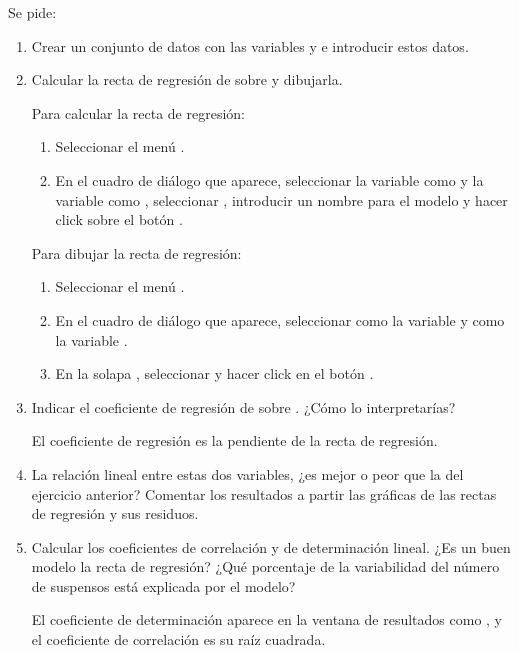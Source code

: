 \begin{enumerate}[leftmargin=*]
Se pide:
\begin{enumerate}
\item  Crear un conjunto de datos con las variables  y  e introducir estos
datos.

\item  Calcular la recta de regresión de  sobre  y dibujarla.
\begin{indicacion}{
Para calcular la recta de regresión:
\begin{enumerate}
\item Seleccionar el menú .
\item En el cuadro de diálogo que aparece, seleccionar la variable  como  y la variable  como , seleccionar , introducir un nombre para el modelo y hacer click sobre el botón .
\end{enumerate}
Para dibujar la recta de regresión:
\begin{enumerate}
\item Seleccionar el menú .
\item En el cuadro de diálogo que aparece, seleccionar como  la variable  y como
 la variable .
\item En la solapa , seleccionar  y hacer click en el botón
.
\end{enumerate}}
\end{indicacion}

\item Indicar el coeficiente de regresión de  sobre . 
¿Cómo lo interpretarías?
\begin{indicacion}{
El coeficiente de regresión es la pendiente de la recta de regresión.}
\end{indicacion}

\item La relación lineal entre estas dos variables, ¿es mejor o peor que la del ejercicio anterior? 
Comentar los resultados a partir las gráficas de las rectas de regresión y sus residuos.

\item Calcular los coeficientes de correlación y de determinación lineal. 
¿Es un buen modelo la recta de regresión?
¿Qué porcentaje de la variabilidad del número de suspensos está explicada por el modelo?
\begin{indicacion}{
El coeficiente de determinación aparece en la ventana de resultados como , y el
coeficiente de correlación es su raíz cuadrada.}
\end{indicacion}


\end{enumerate}
\end{enumerate}
